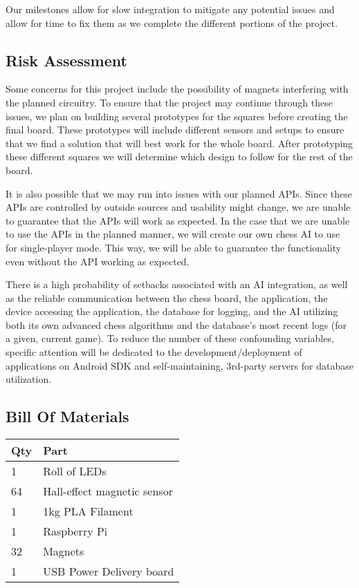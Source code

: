 \documentclass[11pt,journal]{IEEEtran}
\begin{document}
Our milestones allow for slow integration to mitigate any potential issues and allow for time to fix them as we complete the different portions of the project. 

\subsection{Risk Assessment}
Some concerns for this project include the possibility of magnets interfering with the planned circuitry. To ensure that the project may continue through these issues, we plan on building several prototypes for the squares before creating the final board. These prototypes will include different sensors and setups to ensure that we find a solution that will best work for the whole board. After prototyping these different squares we will determine which design to follow for the rest of the board.

It is also possible that we may run into issues with our planned APIs. Since these APIs are controlled by outside sources and usability might change, we are unable to guarantee that the APIs will work as expected. In the case that we are unable to use the APIs in the planned manner, we will create our own chess AI to use for single-player mode. This way, we will be able to guarantee the functionality even without the API working as expected.

There is a high probability of setbacks associated with an AI integration, as well as the reliable communication between the chess board, the application, the device accessing the application, the database for logging, and the AI utilizing both its own advanced chess algorithms and the database's most recent logs (for a given, current game). To reduce the number of these confounding variables, specific attention will be dedicated to the development/deployment of applications on Android SDK and self-maintaining, 3rd-party servers for database utilization.
\subsection{Bill Of Materials}
\begin{table}
\begin{tabular}{|l|l|}
\hline
\textbf{Qty} & \textbf{Part}               \\ \hline
1            & Roll of LEDs                \\ \hline
64           & Hall-effect magnetic sensor \\ \hline
1            & 1kg PLA Filament            \\ \hline
1            & Raspberry Pi                \\ \hline
32           & Magnets                     \\ \hline
1            & USB Power Delivery board    \\ \hline
\end{tabular}
\end{table}
\end{document}
